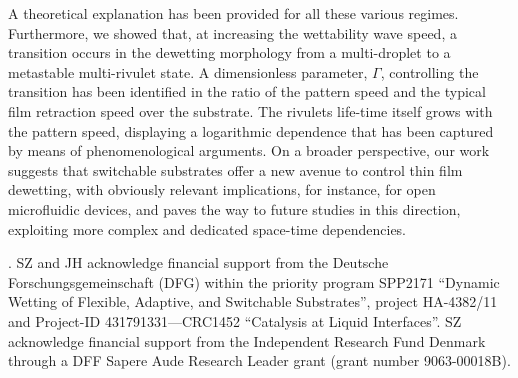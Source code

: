 \documentclass[twocolumn,amsmath,amssymb,showpacs,prl,superscriptaddress]{revtex4-1} %
\begin{document}
A theoretical explanation has been provided for all these various regimes.
Furthermore, we showed that, at increasing the wettability wave speed, a transition occurs in the dewetting morphology from a multi-droplet to a metastable multi-rivulet state. 
A dimensionless parameter, $\Gamma$, controlling the transition has been identified in the ratio of the pattern speed and the typical film retraction speed over the substrate. 
The rivulets life-time itself grows with the pattern speed, displaying a logarithmic dependence that has been captured by means of phenomenological arguments.
On a broader perspective, our work suggests that switchable substrates offer a new avenue to control thin film dewetting, with obviously relevant implications, for instance, for open microfluidic devices, and paves the way to future studies in this direction, exploiting more complex and dedicated space-time dependencies.


. SZ and JH acknowledge financial support from the Deutsche Forschungsgemeinschaft (DFG) within the priority program SPP2171 ``Dynamic Wetting of Flexible, Adaptive, and Switchable Substrates'', project HA-4382/11 and Project-ID 431791331—CRC1452 ``Catalysis at Liquid Interfaces''. SZ acknowledge financial support from the Independent Research Fund Denmark through a DFF Sapere Aude Research Leader grant (grant number 9063-00018B). 



\end{document}

